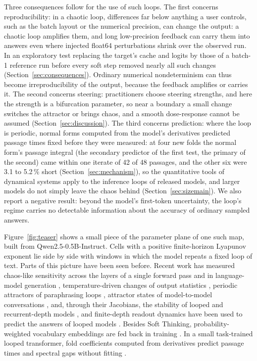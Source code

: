 \documentclass[11pt,letterpaper]{article}
\begin{document}
Three consequences follow for the use of such loops. The first concerns reproducibility: in a chaotic loop, differences far
below anything a user controls, such as the batch layout or the numerical precision, can change the output: a chaotic
loop amplifies them, and long low-precision feedback can carry them into answers even where injected float64
perturbations shrink over the observed run. In an
exploratory test replacing the target's cache and logits by those of a batch-1 reference run before every soft step
removed nearly all such changes (Section~\ref{sec:consequences}).
Ordinary numerical nondeterminism can thus become irreproducibility of the output, because the feedback amplifies or
carries it. The second concerns steering:
practitioners choose steering strengths, and here the strength is a bifurcation parameter, so near a boundary a small
change switches the attractor or brings chaos, and a smooth dose-response cannot be assumed (Section~\ref{sec:discussion}).
The third concerns prediction: where the loop is periodic, normal forms computed from the model's derivatives predicted
passage times fixed before they were measured: at four new folds the normal form's passage integral (the secondary
predictor of the first test, the primary of the second) came within one iterate of 42 of 48 passages, and the other
six were 3.1 to 5.2\,\% short (Section~\ref{sec:mechanism}), so the quantitative tools of dynamical systems apply to the
inference loops of released models, and larger models do not simply leave the chaos behind (Section~\ref{sec:sizemain}). We also report a negative result: beyond the model's first-token uncertainty, the loop's regime carries no detectable information
about the accuracy of ordinary sampled answers.

Figure~\ref{fig:teaser} shows a small piece of the parameter plane of one
such map, built from Qwen2.5-0.5B-Instruct. Cells with a positive finite-horizon Lyapunov exponent lie side by side
with windows in which the model repeats a fixed loop of text. Parts of this picture have been seen
before. Recent work has measured chaos-like sensitivity across the layers of a single forward pass
\cite{li2025quasilyapunov,islam2026numerical} and in language-model generation \cite{jaca2026chaos}, temperature-driven changes of output statistics
\cite{arnold2024phase,nakaishi2024phase,sun2025phase,ruan2026criticality,johnson2026temperature}, periodic
attractors of paraphrasing loops \cite{wang2025attractor}, attractor states of model-to-model conversations
\cite{ko2026attractor}, and, through their Jacobians, the stability of looped and recurrent-depth models
\cite{bai2019deq,bai2021stabilizing,tomihari2025recurrent,yang2026stars}, and finite-depth readout dynamics have
been used to predict the answers of looped models \cite{luo2026prediction}. Besides Soft
Thinking, probability-weighted vocabulary embeddings are fed back in training \cite{zeng2025ponderlm}. In a small task-trained looped transformer, fold coefficients
computed from derivatives predict passage times and spectral gaps without fitting \cite{kim2026phase}.
\end{document}
